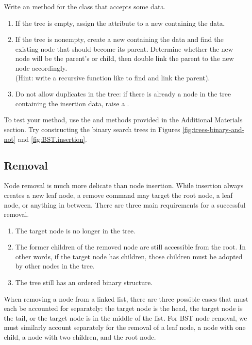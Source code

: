 \begin{problem} %
\label{prob:bst-insert}
Write an  method for the  class that accepts some data.
\begin{enumerate}
\item If the tree is empty, assign the  attribute to a new  containing the data.
\item If the tree is nonempty, create a new  containing the data and find the existing node that should become its parent.
Determine whether the new node will be the parent's  or  child, then double link the parent to the new node accordingly.
\\(Hint: write a recursive function like  to find and link the parent).
\item Do not allow duplicates in the tree: if there is already a node in the tree containing the insertion data, raise a .
\end{enumerate}
To test your method, use the  and  methods provided in the Additional Materials section.
Try constructing the binary search trees in Figures \ref{fig:trees-binary-and-not} and \ref{fig:BST.insertion}.
\end{problem}

\subsection*{Removal} %

Node removal is much more delicate than node insertion.
While insertion always creates a new leaf node, a remove command may target the root node, a leaf node, or anything in between.
There are three main requirements for a successful removal.
\begin{enumerate}
    \item The target node is no longer in the tree.
    \item The former children of the removed node are still accessible from the root.
    In other words, if the target node has children, those children must be adopted by other nodes in the tree.
    \item The tree still has an ordered binary structure.
\end{enumerate}
When removing a node from a linked list, there are three possible cases that must each be accounted for separately: the target node is the head, the target node is the tail, or the target node is in the middle of the list.
For BST node removal, we must similarly account separately for the removal of a leaf node, a node with one child, a node with two children, and the root node.

